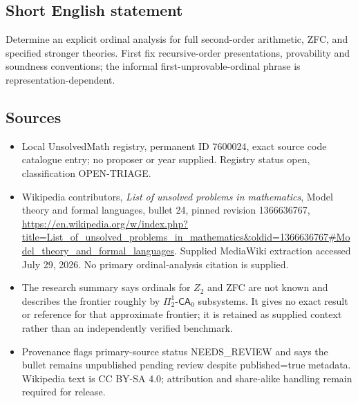 \documentclass[11pt]{article}
\begin{document}
\subsection{Short English statement}
Determine an explicit ordinal analysis for full second-order arithmetic, ZFC, and specified stronger theories. First fix recursive-order presentations, provability and soundness conventions; the informal first-unprovable-ordinal phrase is representation-dependent.
\subsection{Sources}
\begin{itemize}
\item Local UnsolvedMath registry, permanent ID 7600024, exact source code catalogue entry; no proposer or year supplied. Registry status open, classification OPEN-TRIAGE.
\item Wikipedia contributors, \emph{List of unsolved problems in mathematics}, Model theory and formal languages, bullet 24, pinned revision 1366636767, \url{https://en.wikipedia.org/w/index.php?title=List_of_unsolved_problems_in_mathematics&oldid=1366636767#Model_theory_and_formal_languages}. Supplied MediaWiki extraction accessed July 29, 2026. No primary ordinal-analysis citation is supplied.
\item The research summary says ordinals for $Z_2$ and ZFC are not known and describes the frontier roughly by $\Pi^1_2$-$\mathsf{CA}_0$ subsystems. It gives no exact result or reference for that approximate frontier; it is retained as supplied context rather than an independently verified benchmark.
\item Provenance flags primary-source status NEEDS\_REVIEW and says the bullet remains unpublished pending review despite published=true metadata. Wikipedia text is CC BY-SA 4.0; attribution and share-alike handling remain required for release.
\end{itemize}
\end{document}

